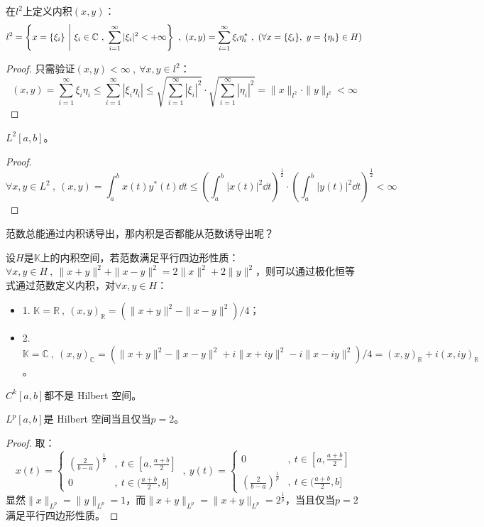 \begin{example}
\quad 在$l^2$上定义内积$(x,y)$：
\[l^2=\left\{x=\{\xi_i\} \ \Bigg{|} \ \xi_i \in \mathbb{C} \ , \ \sum_{i=1}^{\infty}|\xi_i|^2<+\infty\right\} \ , \ (x,y)=\sum_{i=1}^{\infty}\xi_i\eta_i^* \ , \ (\forall x=\{\xi_i\}, \ y=\{\eta_i\} \in H)\]
\end{example}
\begin{proof}
只需验证$(x,y)<\infty \ , \ \forall x,y \in l^2$：
\[(x,y)=\sum_{i=1}^{\infty}\xi_i\eta_i \leq \sum_{i=1}^{\infty}|\xi_i\eta_i| \leq \sqrt{\sum_{i=1}^{\infty}|\xi_i|^2}\cdot\sqrt{\sum_{i=1}^{\infty}|\eta_i|^2}=\|x\|_{l^2}\cdot\|y\|_{l^2}<\infty\]
\end{proof}

\begin{example}
\quad $L^2[a,b]$。
\end{example}
\begin{proof}
\[\forall x,y \in L^2 \ , \ (x,y)=\int_a^bx(t)y^*(t)\dd{t} \leq \left(\int_a^b|x(t)|^2\dd{t}\right)^{\frac{1}{2}}\cdot\left(\int_a^b|y(t)|^2\dd{t}\right)^{\frac{1}{2}}<\infty\]
\end{proof}

范数总能通过内积诱导出，那内积是否都能从范数诱导出呢？
\begin{theorem}
设$H$是$\mathbb{K}$上的内积空间，若范数满足平行四边形性质：$\forall x,y \in H \ , \ \|x+y\|^2+\|x-y\|^2=2\|x\|^2+2\|y\|^2$，则可以通过极化恒等式通过范数定义内积，对$\forall x,y \in H$：
\begin{itemize}
\item 1. $\mathbb{K}=\mathbb{R} \ , \ (x,y)_{\mathbb{R}}=(\|x+y\|^2-\|x-y\|^2)/4$；
\item 2. $\mathbb{K}=\mathbb{C} \ , \ (x,y)_{\mathbb{C}}=(\|x+y\|^2-\|x-y\|^2+i\|x+iy\|^2-i\|x-iy\|^2)/4=(x,y)_{\mathbb{R}}+i(x,iy)_{\mathbb{R}}$。
\end{itemize}
\end{theorem}

\begin{example}
\quad $C^k[a,b]$都不是 Hilbert 空间。
\end{example}

\begin{example}
\quad $L^p[a,b]$是 Hilbert 空间当且仅当$p=2$。
\end{example}
\begin{proof}
取：
\[x(t)=\left\{\begin{array}{cl}
(\frac{2}{b-a})^{\frac{1}{p}} & , \ t\in[a,\frac{a+b}{2}]\\
0 & , \ t\in(\frac{a+b}{2},b]
\end{array}\right. \ , \ y(t)=\left\{\begin{array}{cl}
0 & , \ t\in[a,\frac{a+b}{2}]\\
(\frac{2}{b-a})^{\frac{1}{p}} & , \ t\in(\frac{a+b}{2},b]
\end{array}\right.\]
显然$\|x\|_{L^p}=\|y\|_{L^p}=1$，而$\|x+y\|_{L^p}=\|x+y\|_{L^p}=2^{\frac{1}{p}}$，当且仅当$p=2$满足平行四边形性质。
\end{proof}

